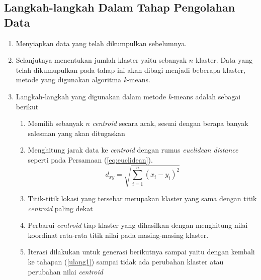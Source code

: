 \subsection{Langkah-langkah Dalam Tahap Pengolahan Data}
\begin{enumerate}
    \item Menyiapkan data yang telah dikumpulkan sebelumnya.
    \item Selanjutnya menentukan jumlah klaster yaitu sebanyak $n$ klaster. Data yang telah dikumupulkan pada tahap ini akan dibagi menjadi beberapa klaster, metode yang digunakan algoritma \textit{k}-means.
    \item Langkah-langkah yang digunakan dalam metode \textit{k}-means adalah sebagai berikut
    \begin{enumerate}
        \item Memilih sebanyak $n$ \textit{centroid} secara acak, sesuai dengan berapa banyak salesman yang akan ditugaskan
        \item \label{ulang1} Menghitung jarak data ke \textit{centroid} dengan rumus \textit{euclidean distance} seperti pada Persamaan (\ref{eq:euclidean}).
        \begin{equation}
        d_{xy}=\sqrt{\sum_{i=1}^{n}(x_i-y_i)^{2}}
        \label{eq:euclidean}
        \end{equation}
        \item Titik-titik lokasi yang tersebar merupakan klaster yang sama dengan titik \textit{centroid} paling dekat
        \item Perbarui \textit{centroid} tiap klaster yang dihasilkan dengan menghitung nilai koordinat rata-rata titik nilai pada masing-masing klaster.
        \item Iterasi dilakukan untuk generasi berikutnya sampai yaitu dengan kembali ke tahapan (\ref{ulang1}) sampai tidak ada perubahan klaster atau perubahan nilai \textit{centroid}
    \end{enumerate}
	

\end{enumerate}
